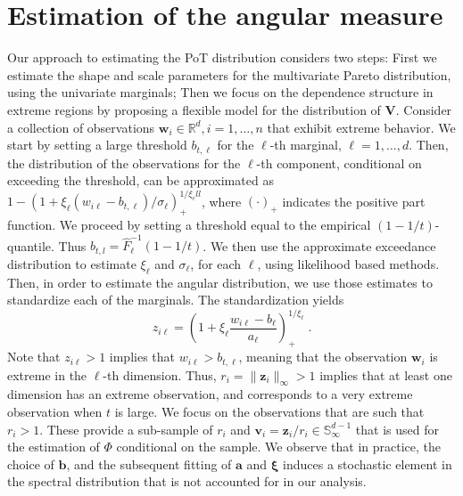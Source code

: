 \section{Estimation of the angular measure\label{sec:methodology}}

Our approach to estimating the PoT distribution considers two steps: First we 
    estimate the shape and scale parameters for the
    multivariate Pareto distribution, using the univariate marginals; Then 
    we focus on the dependence structure in extreme regions by proposing a 
    flexible model for the distribution of $\bm{V}$. Consider a collection of 
    observations  $\bm{w}_i \in {\mathbb R}^d, i = 1, \ldots, n$ that exhibit 
    extreme behavior.  We start by setting a large threshold 
    $b_{t,\ell}$ for the  $\ell$-th marginal, $\ell = 1, \ldots,d$. Then, the 
    distribution of the observations for the $\ell$-th component, 
    conditional on exceeding the threshold, can be 
    approximated as $1 - (1 + \xi_\ell   (w_{i\ell} - b_{t,\ell})/\sigma_\ell)_+^
    {1/\xi_ell}$, where $(\cdot)_+$ indicates the positive part function.  We 
    proceed by setting a threshold equal to the empirical $(1-1/t)$-quantile. 
    Thus $b_{t,l}  = \hat{F}^{-1}_{\ell}(1 - 1/t)$.  We then use the 
    approximate exceedance distribution to estimate $\xi_\ell$ and $\sigma_\ell$,
    for each $\ell$, using likelihood based methods. Then, in order to estimate 
    the angular distribution, we use those estimates to standardize each of 
    the marginals. The standardization yields
    \begin{equation}
            \label{eqn:standardization}
            z_{i\ell} = \left(1 + \xi_{\ell}\frac{w_{i\ell} -
                b_{\ell}}{a_{\ell}}\right)_{+}^{1/\xi_{\ell}}\; .
        \end{equation}
    Note that $z_{i\ell}> 1$ implies that $w_{i\ell} > b_{t,\ell}$, meaning 
    that the observation $\bm{w}_i$ is extreme in the $\ell$-th dimension. 
    Thus, $r_i = \|\bm{z}_i\|_\infty > 1$ implies that at
    least one dimension has an extreme observation, and corresponds 
    to a very extreme observation when $t$ is large. We focus on 
    the observations that are such that $r_i > 1$. These provide a
    sub-sample of $r_i$ and $\bm{v}_i = \bm{z}_i /r_i \in 
    \mathbb{S}_{\infty}^{d-1}$ that is used for  the estimation of 
    $\Phi$ conditional on the sample. We observe that in practice, the choice
    of $\bm{b}$, and the subsequent fitting of $\bm{a}$ and $\bm{\xi}$ induces
    a stochastic element in the spectral distribution that is not accounted for
    in our analysis.  



